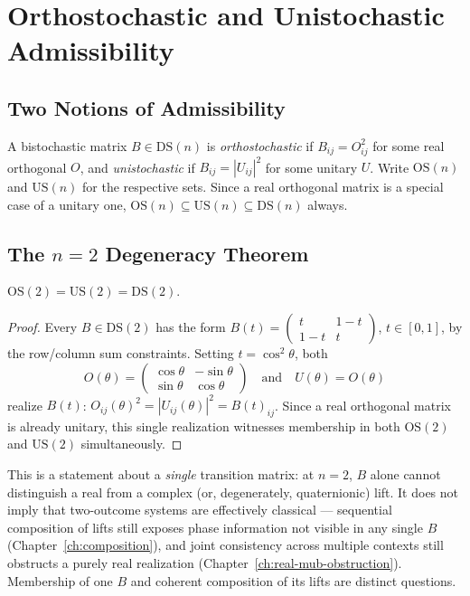 \chapter{Orthostochastic and Unistochastic Admissibility}
\label{ch:unistochastic}

\section{Two Notions of Admissibility}

A bistochastic matrix $B \in \mathrm{DS}(n)$ is \emph{orthostochastic} if $B_{ij} =
O_{ij}^2$ for some real orthogonal $O$, and \emph{unistochastic} if $B_{ij} =
|U_{ij}|^2$ for some unitary $U$. Write $\mathrm{OS}(n)$ and $\mathrm{US}(n)$ for
the respective sets. Since a real orthogonal matrix is a special case of a
unitary one, $\mathrm{OS}(n) \subseteq \mathrm{US}(n) \subseteq \mathrm{DS}(n)$
always.

\section{The \texorpdfstring{$n=2$}{n=2} Degeneracy Theorem}
\label{sec:n2degeneracy}

\begin{theorem}[$n=2$ coincidence]
\label{thm:n2degeneracy}
$\mathrm{OS}(2) = \mathrm{US}(2) = \mathrm{DS}(2)$.
\end{theorem}

\begin{proof}
Every $B \in \mathrm{DS}(2)$ has the form $B(t) = \begin{pmatrix} t & 1-t \\ 1-t &
t \end{pmatrix}$, $t \in [0,1]$, by the row/column sum constraints. Setting
$t=\cos^2\theta$, both
\begin{equation}
O(\theta) = \begin{pmatrix} \cos\theta & -\sin\theta \\ \sin\theta & \cos\theta
\end{pmatrix}
\quad\text{and}\quad
U(\theta) = O(\theta)
\end{equation}
realize $B(t)$: $O_{ij}(\theta)^2 = |U_{ij}(\theta)|^2 = B(t)_{ij}$. Since a real
orthogonal matrix is already unitary, this single realization witnesses
membership in both $\mathrm{OS}(2)$ and $\mathrm{US}(2)$ simultaneously.
\end{proof}

\begin{remark}
This is a statement about a \emph{single} transition matrix: at $n=2$, $B$ alone
cannot distinguish a real from a complex (or, degenerately, quaternionic) lift.
It does not imply that two-outcome systems are effectively classical — sequential
composition of lifts still exposes phase information not visible in any single
$B$ (Chapter~\ref{ch:composition}), and joint consistency across multiple
contexts still obstructs a purely real realization
(Chapter~\ref{ch:real-mub-obstruction}). Membership of one $B$ and coherent
composition of its lifts are distinct questions.
\end{remark}


